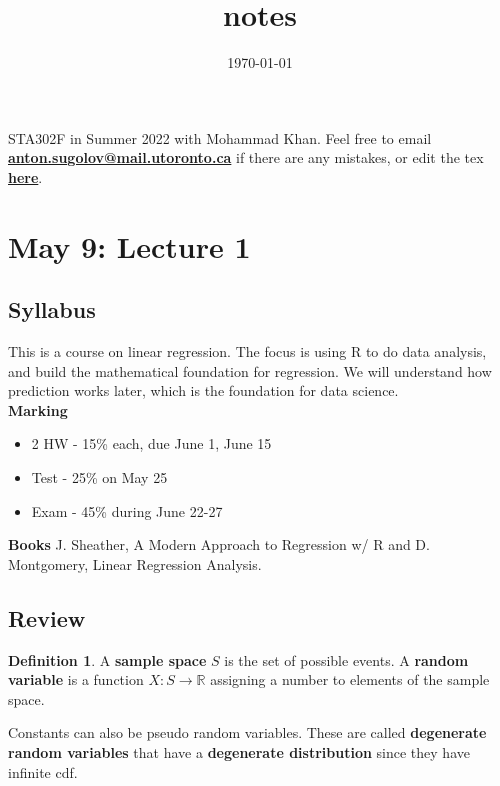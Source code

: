 \documentclass[12pt, a4paper]{article}
\title{{\Course} notes}
\date{\today}
\theoremstyle{definition}
\newtheorem{definition}{Definition}
\newcommand{\R}{\mathbb{R}}                           %
\begin{document}
	
	\maketitle
	
	STA302F in Summer 2022 with Mohammad Khan. Feel free to email  \href{mailto://anton.sugolov@mail.utoronto.ca}{\bf anton.sugolov@mail.utoronto.ca} if there are any mistakes, or edit the tex \href{https://sugolov.github.io/blog/files/sta302.pdf}{\bf here}.
	
	\tableofcontents

\newpage
	
	\section{May 9: Lecture 1}
	\subsection{Syllabus}
	
	This is a course on linear regression. The focus is using R to do data analysis, and build the mathematical foundation for regression. We will understand how prediction works later, which is the foundation for data science.\\
	
	{\bf Marking} 
	\begin{itemize}
		\item 2 HW - 15\% each, due June 1, June 15
		\item Test - 25\% on May 25
		\item Exam - 45\% during June 22-27
	\end{itemize}
	
	{\bf Books} J. Sheather, A Modern Approach to Regression w/ R and D. Montgomery, Linear Regression Analysis.
	
	\subsection{Review}
	
	\begin{definition}
		A {\bf sample space} $S$ is the set of possible events. 
		A {\bf random variable} is a function $X \colon S \to \R$ assigning a number to elements of the sample space.
	\end{definition}

	Constants can also be pseudo random variables. These are called {\bf degenerate random variables} that have a {\bf degenerate distribution} since they have infinite cdf.
	
\end{document}
